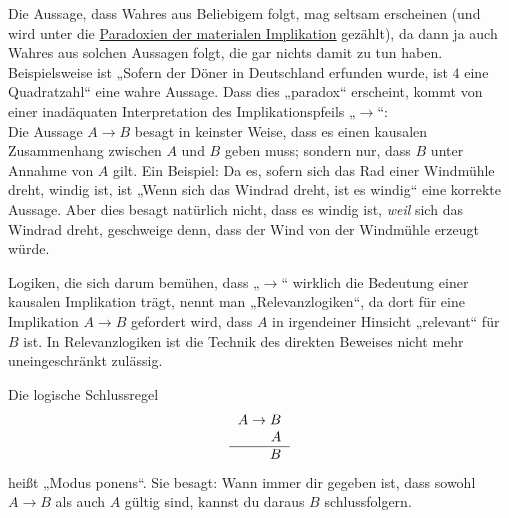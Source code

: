 \begin{bem}
 Die Aussage, dass Wahres aus Beliebigem folgt, mag seltsam erscheinen (und wird unter die \href{https://de.wikipedia.org/wiki/Paradoxien_der_materialen_Implikation}{Paradoxien der materialen Implikation} gezählt), da dann ja auch Wahres aus solchen Aussagen folgt, die gar nichts damit zu tun haben. Beispielsweise ist „Sofern der Döner in Deutschland erfunden wurde, ist $4$ eine Quadratzahl“ eine wahre Aussage. Dass dies „paradox“ erscheint, kommt von einer inadäquaten Interpretation des Implikationspfeils „$\to$“: \\
 Die Aussage $A\to B$ besagt in keinster Weise, dass es einen kausalen Zusammenhang zwischen $A$ und $B$ geben muss; sondern nur, dass $B$ unter Annahme von $A$ gilt. Ein Beispiel: Da es, sofern sich das Rad einer Windmühle dreht, windig ist, ist „Wenn sich das Windrad dreht, ist es windig“ eine korrekte Aussage. Aber dies besagt natürlich nicht, dass es windig ist, \emph{weil} sich das Windrad dreht, geschweige denn, dass der Wind von der Windmühle erzeugt würde.%
\end{bem}


\begin{bem}[* Relevanzlogiken]
  Logiken, die sich darum bemühen, dass „$\to$“ wirklich die Bedeutung einer kausalen Implikation trägt, nennt man „Relevanzlogiken“, da dort für eine Implikation $A\to B$ gefordert wird, dass $A$ in irgendeiner Hinsicht „relevant“ für $B$ ist. In Relevanzlogiken ist die Technik des direkten Beweises nicht mehr uneingeschränkt zulässig.
\end{bem}



\begin{axi} \label{modusponens}
Die logische Schlussregel
\[ \begin{tabular}{r}
    $A\to B$ \\
    $A$ \\
    \hline
    $B$
   \end{tabular} \]
   heißt „Modus ponens“. Sie besagt: Wann immer dir gegeben ist, dass sowohl $A\to B$ als auch $A$ gültig sind, kannst du daraus $B$ schlussfolgern.
\end{axi}



